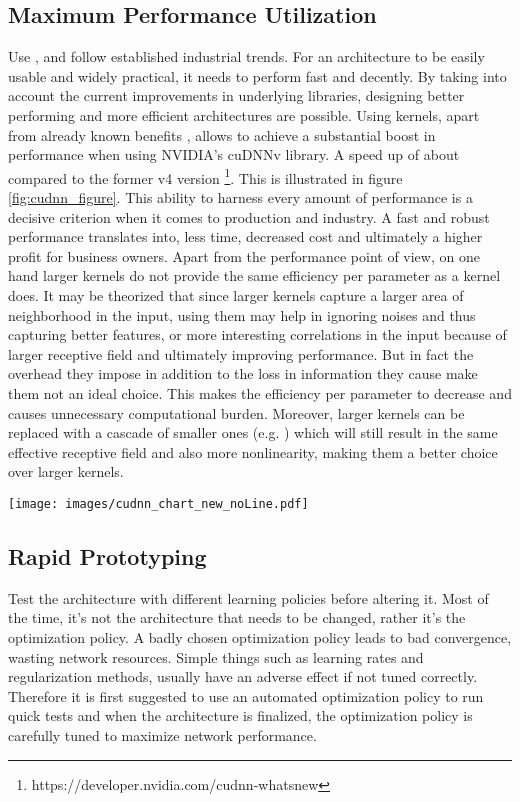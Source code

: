 \documentclass{article} \usepackage{lets_keepit_simple,times}
\begin{document}
\subsection{Maximum Performance Utilization}
Use , and follow established industrial trends. For an architecture to be easily usable and widely practical, it needs to perform fast and decently. By taking into account the current improvements in underlying libraries, designing better performing and more efficient architectures are possible. Using  kernels, apart from already known benefits \cite{Simonyan_VGG_2014}, allows to achieve a substantial boost in performance when using NVIDIA's cuDNNv library. A speed up of about  compared to the former v4 version \footnote{https://developer.nvidia.com/cudnn-whatsnew}. This is illustrated in figure \ref{fig:cudnn_figure}. This ability to harness every amount of performance is a decisive criterion when it comes to production and industry. A fast and robust performance translates into, less time, decreased cost and ultimately a higher profit for business owners. Apart from the performance point of view, on one hand larger kernels do not provide the same efficiency per parameter as a  kernel does. It may be theorized that since larger kernels capture a larger area of neighborhood in the input, using them may help in ignoring noises and thus capturing better features, or more interesting correlations in the input because of larger receptive field and ultimately improving performance. But in fact the overhead they impose in addition to the loss in information they cause make them not an ideal choice. This makes the efficiency per parameter to decrease and causes unnecessary computational burden. Moreover, larger kernels can be replaced with a cascade of smaller ones (e.g. ) which will still result in the same effective receptive field and also more nonlinearity, making them a better choice over larger kernels. 

\begin{figure*}[h]
\begin{center}
\texttt{[image: images/cudnn\_chart\_new\_noLine.pdf]}
\end{center}
 \caption{Using  kernels results in  faster training when using cuDNNv}
\label{fig:cudnn_figure}
\end{figure*}
\subsection{Rapid Prototyping}
Test the architecture with different learning policies before altering it. Most of the time, it's not the architecture that needs to be changed, rather it's the optimization policy. A badly chosen optimization policy leads to bad convergence, wasting network resources. Simple things such as learning rates and regularization methods, usually have an adverse effect if not tuned correctly. Therefore it is first suggested to use an automated optimization policy to run quick tests and when the architecture is finalized, the optimization policy is carefully tuned to maximize network performance.
\end{document}
